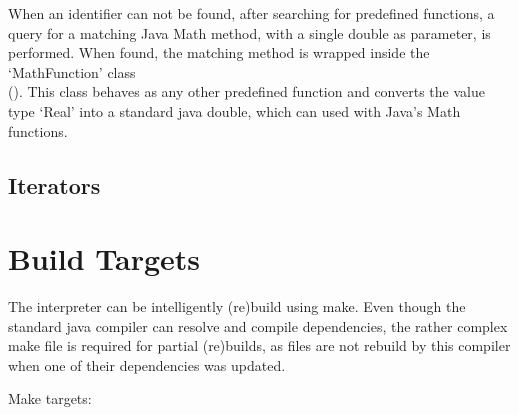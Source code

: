 
When an identifier can not be found, after searching for predefined functions, a query for a matching Java Math method, with a single double as parameter, is performed. When found, the matching method is wrapped inside the `MathFunction' class\\ (). This class behaves as any other predefined function and converts the \setlX{} value type `Real' into a standard java double, which can used with Java's Math functions.
\subsection{Iterators}


\section{Build Targets}

The interpreter can be intelligently (re)build using make. Even though the standard java compiler can resolve and compile dependencies, the rather complex make file is required for partial (re)builds, as files are not rebuild by this compiler when one of their dependencies was updated.

Make targets:

